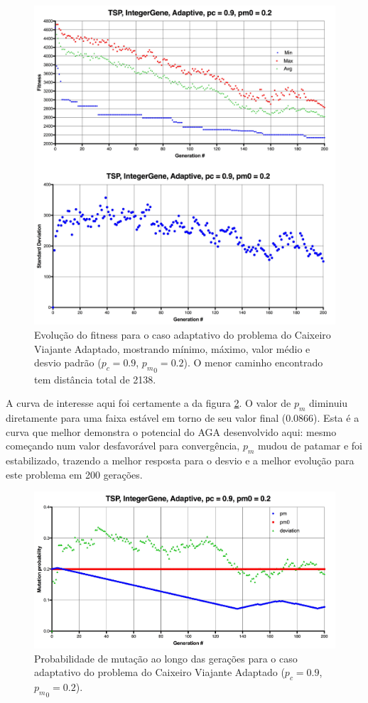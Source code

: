 \begin{figure}[ht!]
    \centering \includegraphics[width=1.0\textwidth]{tsp_02_adaptive.jpg}
    \caption{Evolução do fitness para o caso adaptativo do problema do Caixeiro Viajante Adaptado, mostrando mínimo, máximo, valor médio e desvio padrão ($p_c=0.9$, ${p_m}_0=0.2$). O menor caminho encontrado tem distância total de 2138.}
    \label{fig:tsp_02_adaptative}
\end{figure}

A curva de interesse aqui foi certamente a da figura \ref{fig:tsp_02_adaptive_pm}. O valor de $p_m$ diminuiu diretamente para uma faixa estável em torno de seu valor final (0.0866). Esta é a curva que melhor demonstra o potencial do AGA desenvolvido aqui: mesmo começando num valor desfavorável para convergência, $p_m$ mudou de patamar e foi estabilizado, trazendo a melhor resposta para o desvio e a melhor evolução para este problema em 200 gerações.

\begin{figure}[ht!]
    \centering \includegraphics[width=1.0\textwidth]{tsp_02_adaptive_pm.jpg}
    \caption{Probabilidade de mutação ao longo das gerações para o caso adaptativo do problema do Caixeiro Viajante Adaptado ($p_c=0.9$, ${p_m}_0=0.2$).}
    \label{fig:tsp_02_adaptive_pm}
\end{figure}

